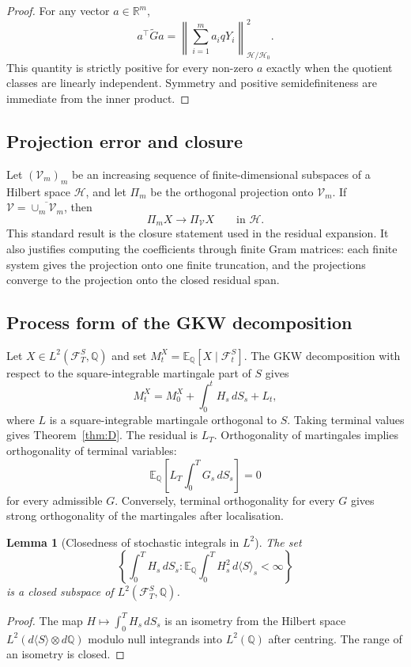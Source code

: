 \documentclass[11pt,oneside]{article}
\theoremstyle{plain}
\newtheorem{lemma}[theorem]{Lemma}
\theoremstyle{definition}
\theoremstyle{remark}
\newcommand{\R}{\mathbb{R}}
\newcommand{\E}{\mathbb{E}}
\newcommand{\Q}{\mathbb{Q}}
\newcommand{\FS}{\mathcal F^S}
\newcommand{\norm}[1]{\left\lVert #1\right\rVert}
\begin{document}
\begin{proof}
For any vector $a\in\R^m$,
\[
a^\top \widetilde G a
=\norm{\sum_{i=1}^m a_i qY_i}_{\mathcal H/\mathcal H_0}^2.
\]
This quantity is strictly positive for every non-zero $a$ exactly when the quotient classes are linearly independent. Symmetry and positive semidefiniteness are immediate from the inner product.
\end{proof}

\subsection*{Projection error and closure}
Let $(\mathcal V_m)_m$ be an increasing sequence of finite-dimensional subspaces of a Hilbert space $\mathcal H$, and let $\Pi_m$ be the orthogonal projection onto $\mathcal V_m$. If $\mathcal V=\overline{\cup_m\mathcal V_m}$, then
\[
\Pi_m X\to \Pi_\mathcal V X
\qquad\text{in }\mathcal H.
\]
This standard result is the closure statement used in the residual expansion. It also justifies computing the coefficients through finite Gram matrices: each finite system gives the projection onto one finite truncation, and the projections converge to the projection onto the closed residual span.


\subsection*{Process form of the GKW decomposition}
Let $X\in L^2(\FS_T,\Q)$ and set $M^X_t=\E_\Q[X\mid\FS_t]$. The GKW decomposition with respect to the square-integrable martingale part of $S$ gives
\[
M^X_t=M^X_0+\int_0^t H_s\,dS_s+L_t,
\]
where $L$ is a square-integrable martingale orthogonal to $S$. Taking terminal values gives Theorem~\ref{thm:D}. The residual is $L_T$. Orthogonality of martingales implies orthogonality of terminal variables:
\[
\E_\Q\left[L_T\int_0^T G_s\,dS_s\right]=0
\]
for every admissible $G$. Conversely, terminal orthogonality for every $G$ gives strong orthogonality of the martingales after localisation.

\begin{lemma}[Closedness of stochastic integrals in $L^2$]
\label{lem:l2-closed-stochastic-integrals}
The set
\[
\left\{\int_0^T H_s\,dS_s: \E_\Q\int_0^T H_s^2\,d\langle S\rangle_s<\infty\right\}
\]
is a closed subspace of $L^2(\FS_T,\Q)$.
\end{lemma}

\begin{proof}
The map $H\mapsto\int_0^T H_s\,dS_s$ is an isometry from the Hilbert space $L^2(d\langle S\rangle\otimes d\Q)$ modulo null integrands into $L^2(\Q)$ after centring. The range of an isometry is closed.
\end{proof}
\end{document}
